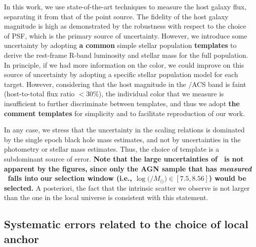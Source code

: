 \documentclass[apj]{emulateapj}
\begin{document}
In this work, we use state-of-the-art techniques to measure the host galaxy flux, separating it from that of the point source. The fidelity of the host galaxy magnitude is high as demonstrated by the robustness with respect to the choice of PSF, which is the primary source of uncertainty. However, we introduce some uncertainty by adopting {\bf a common} simple stellar population {\bf templates} to derive the rest-frame R-band luminosity and stellar mass for the full population. In principle, if we had more information on the color, we could improve on this source of uncertainty by adopting a specific stellar population model for each target. However, considering that the host magnitude in the \hst/ACS band is faint (host-to-total flux ratio $< 30\%$), the individual color that we measure is insufficient to further discriminate between templates, and thus we adopt {\bf the comment templates} for simplicity and to facilitate reproduction of our work.

In any case, we stress that the uncertainty in the scaling relations is dominated by the single epoch black hole mass estimates, and not by uncertainties in the photometry or stellar mass estimates. Thus, the choice of template is a subdominant source of error. {\bf Note that the large uncertainties of \mbh\ is not apparent by the figures, since only the AGN sample that has {\it measured} \mbh\ falls into our selection window (i.e., $\log($\mbh$/M_{\odot})\in[7.5, 8.56]$) would be selected.} A posteriori, the fact that the intrinsic scatter we observe is not larger than the one in the local universe is consistent with this statement.

\subsection{Systematic errors related to the choice of local anchor}
\label{sec:local_sys}
\end{document}
